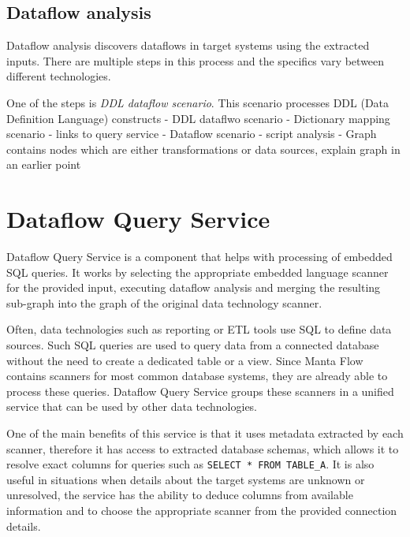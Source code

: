 \subsection{Dataflow analysis}

Dataflow analysis discovers dataflows in target systems using the extracted inputs. There are multiple steps in this process and the specifics vary between different technologies.
\par
One of the steps is \textit{DDL dataflow scenario}. This scenario processes DDL (Data Definition Language) constructs 
- DDL dataflwo scenario
- Dictionary mapping scenario - links to query service
- Dataflow scenario - script analysis
- Graph contains nodes which are either transformations or data sources, explain graph in an earlier point


\section{Dataflow Query Service}

Dataflow Query Service is a component that helps with processing of embedded SQL queries. It works by selecting the appropriate embedded language scanner for the provided input, executing dataflow analysis and merging the resulting sub-graph into the graph of the original data technology scanner.
\par
Often, data technologies such as reporting or ETL tools use SQL to define data sources. Such SQL queries are used to query data from a connected database without the need to create a dedicated table or a view. Since Manta Flow contains scanners for most common database systems, they are already able to process these queries. Dataflow Query Service groups these scanners in a unified service that can be used by other data technologies.
\par
One of the main benefits of this service is that it uses metadata extracted by each scanner, therefore it has access to extracted database schemas, which allows it to resolve exact columns for queries such as \texttt{SELECT * FROM TABLE\_A}. It is also useful in situations when details about the target systems are unknown or unresolved, the service has the ability to deduce columns from available information and to choose the appropriate scanner from the provided connection details.

